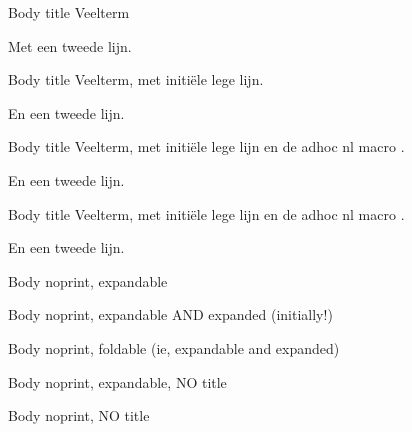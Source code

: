 \documentclass{ximera}
\begin{document}
\begin{definition}[Veelterm]
Body title Veelterm

Met een tweede lijn.
\end{definition}

\begin{definition}[title={Veelterm, met een lege lijn (en een komma en haakjes in de title)}]

 Body title Veelterm, met initiële lege lijn.

 En een tweede lijn.
\end{definition}

\begin{definition}[title={Veelterm, met een lege lijn EN nl (en een komma en haakjes in de title)}]\nl

 Body title Veelterm, met initiële lege lijn en de adhoc nl macro .

 En een tweede lijn.
\end{definition}

\begin{definition}[title={Veelterm, zonder een lege lijn maar MET nl (en een komma en haakjes in de title)}]\nl
 Body title Veelterm, met initiële lege lijn en de adhoc nl macro .

 En een tweede lijn.
\end{definition}


\begin{definition}[print=false,expandable=true,title={Veelterm, expandable and no print}]
Body noprint, expandable 
\end{definition}

\begin{definition}[print=false,expandable=true,expanded,title={Veelterm, expandable and expanded}]
Body noprint, expandable AND expanded (initially!)
\end{definition}

\begin{definition}[print=false,foldable=true,title={Veelterm, foldable (synonym for expandable and expanded)}]
Body noprint,  foldable (ie, expandable and expanded)
\end{definition}

\begin{definition}[print=false,expandable]
Body noprint, expandable, NO title
\end{definition}

\begin{definition}[print=false]
Body noprint,  NO title
\end{definition}
\end{document}
